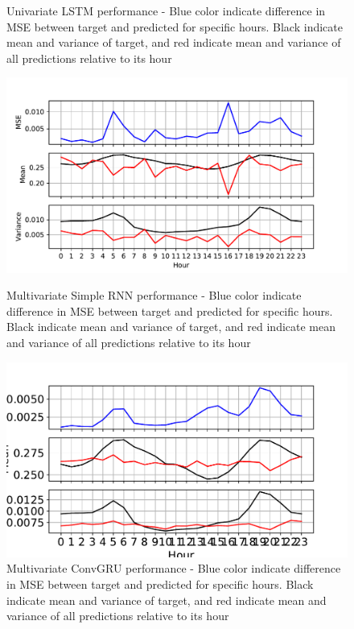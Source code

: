 \documentclass
[twocolumn,
secnumarabic,
nobibnotes,
aps,
prl,
reprint,
groupedaddress,
amsmath,
amssymb,
]{revtex4-2}
\begin{document}
\begin{figure}
  \caption{\label{fig:univariate_hourly_stats_LSTM} Univariate LSTM performance - Blue color indicate difference in MSE between target and predicted for specific hours. Black indicate mean and variance of target, and red indicate mean and variance of all predictions relative to its hour}
\end{figure}

\begin{figure}
  \includegraphics[width=\columnwidth]{figures/multivariate_hourly_stats_RNN.pdf}
  \caption{\label{fig:multivariate_hourly_stats_RNN} Multivariate Simple RNN performance - Blue color indicate difference in MSE between target and predicted for specific hours. Black indicate mean and variance of target, and red indicate mean and variance of all predictions relative to its hour}
  \includegraphics[width=\columnwidth]{figures/multivariate_hourly_stats_convGRU.pdf}
  \caption{\label{fig:multivariate_hourly_stats_convGRU} Multivariate ConvGRU performance - Blue color indicate difference in MSE between target and predicted for specific hours. Black indicate mean and variance of target, and red indicate mean and variance of all predictions relative to its hour}

\end{figure}
\end{document}

